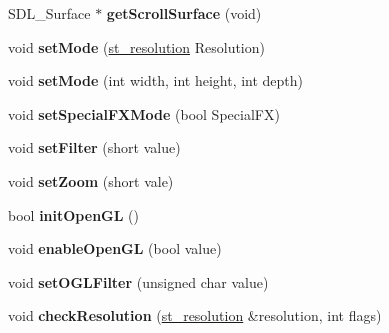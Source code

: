 \begin{DoxyCompactItemize}
\item 
\hypertarget{class_c_video_driver_aa9d3223e7cf5145e499e9ee781bae61e}{
SDL\_\-Surface $\ast$ {\bfseries getScrollSurface} (void)}
\label{class_c_video_driver_aa9d3223e7cf5145e499e9ee781bae61e}

\item 
\hypertarget{class_c_video_driver_a8bf0ab27ab4410fe61aa1769706d4a1b}{
void {\bfseries setMode} (\hyperlink{structst__resolution}{st\_\-resolution} Resolution)}
\label{class_c_video_driver_a8bf0ab27ab4410fe61aa1769706d4a1b}

\item 
\hypertarget{class_c_video_driver_a3c62d186d857ef698e62276a3bafde85}{
void {\bfseries setMode} (int width, int height, int depth)}
\label{class_c_video_driver_a3c62d186d857ef698e62276a3bafde85}

\item 
\hypertarget{class_c_video_driver_aab2d3266a7c83440fc0604b6fbcc5458}{
void {\bfseries setSpecialFXMode} (bool SpecialFX)}
\label{class_c_video_driver_aab2d3266a7c83440fc0604b6fbcc5458}

\item 
\hypertarget{class_c_video_driver_af4aacfa48d355ac28f74f219680423be}{
void {\bfseries setFilter} (short value)}
\label{class_c_video_driver_af4aacfa48d355ac28f74f219680423be}

\item 
\hypertarget{class_c_video_driver_a91f427f464a5a6f116aa8dc421ae965a}{
void {\bfseries setZoom} (short vale)}
\label{class_c_video_driver_a91f427f464a5a6f116aa8dc421ae965a}

\item 
\hypertarget{class_c_video_driver_ae23e209b099a340c56bf34ec94266ac7}{
bool {\bfseries initOpenGL} ()}
\label{class_c_video_driver_ae23e209b099a340c56bf34ec94266ac7}

\item 
\hypertarget{class_c_video_driver_ace8ae4fafb62e9aa88cfcbb3d3250d67}{
void {\bfseries enableOpenGL} (bool value)}
\label{class_c_video_driver_ace8ae4fafb62e9aa88cfcbb3d3250d67}

\item 
\hypertarget{class_c_video_driver_a867607d76a2f6d0532ef5ec819b23e9f}{
void {\bfseries setOGLFilter} (unsigned char value)}
\label{class_c_video_driver_a867607d76a2f6d0532ef5ec819b23e9f}

\item 
\hypertarget{class_c_video_driver_afd8316fa582586a3ce735f540c1a00cd}{
void {\bfseries checkResolution} (\hyperlink{structst__resolution}{st\_\-resolution} \&resolution, int flags)}
\label{class_c_video_driver_afd8316fa582586a3ce735f540c1a00cd}


\end{DoxyCompactItemize}
